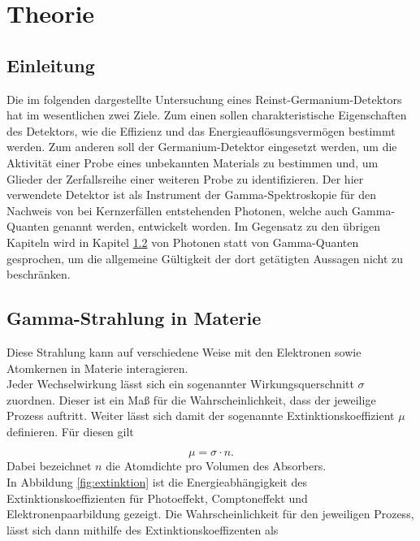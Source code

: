 \section{Theorie}
\label{sec:Theorie}

\subsection{Einleitung}
\label{subsec:Einleitung}

Die im folgenden dargestellte Untersuchung eines Reinst-Germanium-Detektors hat im wesentlichen zwei Ziele.
Zum einen sollen charakteristische Eigenschaften des Detektors, wie die Effizienz und das Energieauflösungsvermögen bestimmt werden.
Zum anderen soll der Germanium-Detektor eingesetzt werden, um die Aktivität einer Probe eines unbekannten Materials zu bestimmen und, um Glieder der Zerfallsreihe einer weiteren Probe zu identifizieren.
Der hier verwendete Detektor ist als Instrument der Gamma-Spektroskopie für den Nachweis von bei Kernzerfällen entstehenden Photonen, welche auch Gamma-Quanten genannt werden, entwickelt worden.
Im Gegensatz zu den übrigen Kapiteln wird in Kapitel \ref{subsec:t1} von Photonen statt von Gamma-Quanten gesprochen, um die allgemeine Gültigkeit der dort getätigten Aussagen nicht zu beschränken.

\subsection{Gamma-Strahlung in Materie}
\label{subsec:t1}
Diese Strahlung kann auf verschiedene Weise mit den Elektronen sowie Atomkernen in Materie
interagieren.\\
Jeder Wechselwirkung lässt sich ein sogenannter Wirkungsquerschnitt
$\sigma$ zuordnen. Dieser ist ein Maß für die Wahrscheinlichkeit,
dass der jeweilige Prozess auftritt. Weiter lässt sich damit der sogenannte Extinktionskoeffizient $\mu$ definieren.
Für diesen gilt

\begin{equation}
  \label{eqn:extinktion}
  \mu = \sigma \cdot n .
\end{equation}
Dabei bezeichnet $n$ die Atomdichte pro Volumen des Absorbers.\\
In Abbildung \ref{fig:extinktion} ist die Energieabhängigkeit des Extinktionskoeffizienten für Photoeffekt, Comptoneffekt
und Elektronenpaarbildung gezeigt.
Die Wahrscheinlichkeit für den jeweiligen Prozess, lässt sich dann mithilfe des Extinktionskoeffizenten als

